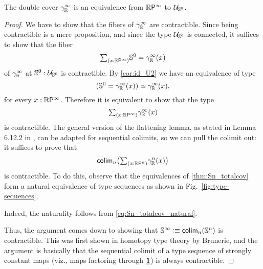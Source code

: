 \begin{thm}\label{thm:RPoo_US0}
The double cover $\tautfam[\R]{\infty}$ is an equivalence from $\rprojective{\infty}$ to $\UU_{\sphere{0}}$. 
\end{thm}

\begin{proof}
We have to show that the fibers of $\tautfam[\R]{\infty}$ are contractible.
Since being contractible is a mere proposition, and since the type $\UU_{\sphere{0}}$
is connected, it suffices to show that the fiber
\begin{equation*}
\sm{x:\rprojective{\infty}}\sphere{0}=\tautfam[\R]{\infty}(x)
\end{equation*}
of $\tautfam[\R]{\infty}$ at $\sphere{0}:\UU_{\sphere{0}}$ is contractible.
By \autoref{cor:id_U2} we have an equivalence of type
\begin{equation*}
\eqv{({\sphere{0}}=\tautfam[\R]{\infty}(x))}{\tautfam[\R]{\infty}(x)},
\end{equation*}
for every $x:\rprojective{\infty}$. 
Therefore it is equivalent to show that the type
\begin{equation*}
\sm{x:\rprojective{\infty}}\tautfam[\R]{\infty}(x)
\end{equation*}
is contractible. The general version of the flattening lemma, as stated in
Lemma 6.12.2 in \cite{hottbook}, can be adapted for sequential colimits, so
we can pull the colimit out: it suffices to prove that
\begin{equation*}
\tfcolim_n\bigl(\sm{x:\rprojective{n}}\tautfam[\R]{n}(x)\bigr)
\end{equation*}
is contractible. 
To do this, observe that the equivalences of \autoref{thm:Sn_totalcov} form
a natural equivalence of type sequences as shown in Fig.~\ref{fig:type-sequences}.
\begin{figure*}
  \centering
{}
\caption{Natural equivalence of type sequences for Thm~\ref{thm:RPoo_US0}.}
\label{fig:type-sequences}
\end{figure*}
Indeed, the naturality follows from \autoref{eq:Sn_totalcov_natural}.

Thus, the argument comes down to showing that $\sphere{\infty}\defeq\tfcolim_n(\sphere{n})$
is contractible. This was first shown in homotopy type theory by Brunerie, and
the argument is basically that the sequential colimit of a type sequence of
strongly constant maps (viz., maps factoring through $\unit$) is always contractible.
\end{proof}

